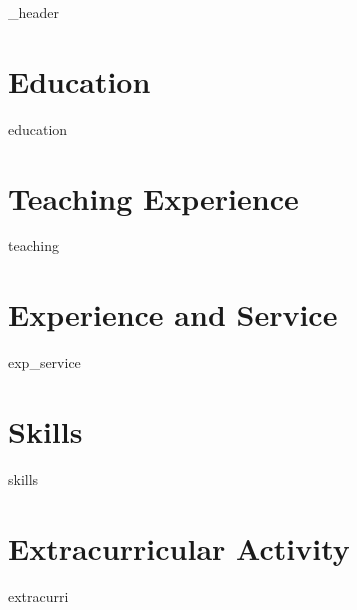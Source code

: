 \documentclass[letter,10pt]{article}
\author{Taeyoung Chang}
\begin{document}
{_header}
\vspace*{10pt}

\section{Education}
{education}
\vspace*{10pt}




\section{Teaching Experience}
{teaching}
\vspace*{10pt}


\section{Experience and Service}
{exp_service}
\vspace*{10pt}

\section{Skills}
\vspace*{3pt}
{skills}
\vspace*{10pt}

\section{Extracurricular Activity}
\vspace*{3pt}
{extracurri}
\vspace*{10pt}

\end{document}
